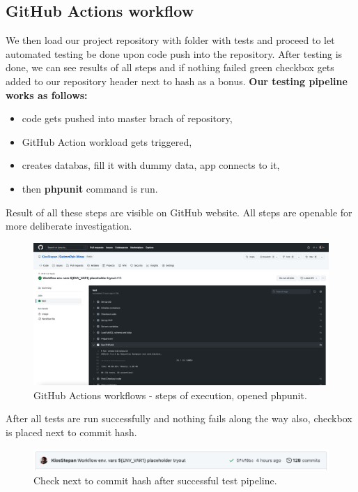 \subsection{GitHub Actions workflow}
We then load our project repository with folder with tests and proceed to let automated testing be done upon code push into the repository. After testing is done, we can see results of all steps and if nothing failed green checkbox gets added to our repository header next to hash as a bonus.   
\newline
\textbf{Our testing pipeline works as follows:}
\begin{itemize}
    \item code gets pushed into master brach of repository,
    \item GitHub Action workload gets triggered,
    \item creates databas, fill it with dummy data, app connects to it,
    \item then \textbf{phpunit} command is run.
\end{itemize} 
Result of all these steps are visible on GitHub website. All steps are openable for more deliberate investigation.
\begin{figure}[h]	
    \centering	
    \includegraphics[scale=0.205]{img/phpunit_actionswf.png}
    \caption{GitHub Actions workflows - steps of execution, opened phpunit.}
    \label{fig4.4:phpunitghactionswf}
\end{figure}
\newline
After all tests are run successfully and nothing fails along the way also, checkbox is placed next to commit hash.
\begin{figure}[h]	
    \centering	
    \includegraphics[scale=0.435]{img/phpunit_actionscheck.png}
    \caption{Check next to commit hash after successful test pipeline.}
    \label{fig4.5:phpunitghactioncheck}
\end{figure}
